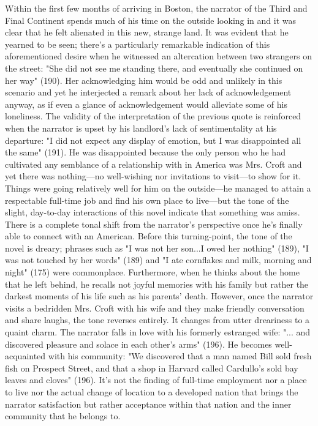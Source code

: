 \documentclass[12pt]{article}
\begin{document}
Within the first few months of arriving in Boston, the narrator of the Third and Final Continent spends much of his time on the outside looking in and it was clear that he felt alienated in this new, strange land. It was evident that he yearned to be seen; there's a particularly remarkable indication of this aforementioned desire when he witnessed an altercation between two strangers on the street: "She did not see me standing there, and eventually she continued on her way" (190). Her acknowledging him would be odd and unlikely in this scenario and yet he interjected a remark about her lack of acknowledgement anyway, as if even
a glance of acknowledgement would alleviate some of his loneliness. The validity of the interpretation of the previous quote is reinforced when the narrator is upset by his landlord's lack of sentimentality at his departure: "I did not expect any display of emotion, but I was disappointed all the same" (191). He was disappointed because the only person who he had cultivated any semblance of a relationship with in America was Mrs. Croft and yet there was nothing---no well-wishing nor invitations to visit---to show for it. Things were going relatively well for him on the outside---he managed to attain a respectable full-time job and find his own place to live---but the tone of the slight, day-to-day interactions of this novel indicate that something was amiss. \\

There is a complete tonal shift from the narrator's perspective once he's finally able to connect with an American. Before this
turning-point, the tone of the novel is dreary; phrases such as "I was not her son...I owed her nothing" (189), "I was not touched
by her words" (189) and "I ate cornflakes and milk, morning and night" (175) were commonplace. Furthermore, when he thinks about
the home that he left behind, he recalls not joyful memories with his family but rather the darkest moments of his life 
such as his parents' death. However, once the narrator visits a bedridden Mrs. Croft with his wife and they make friendly conversation and share laughs, the tone reverses entirely. It changes from utter dreariness to a quaint charm. The narrator
falls in love with his formerly estranged wife: "... and discovered pleasure and solace in each other's arms" (196). He
becomes well-acquainted with his community: "We discovered that a man named Bill sold fresh fish on Prospect Street, and that
a shop in Harvard called Cardullo's sold bay leaves and cloves" (196). It's not the finding of full-time employment
nor a place to live nor the actual change of location to a developed nation that brings the narrator satisfaction but rather
acceptance within that nation and the inner community that he belongs to. \\
\end{document}
